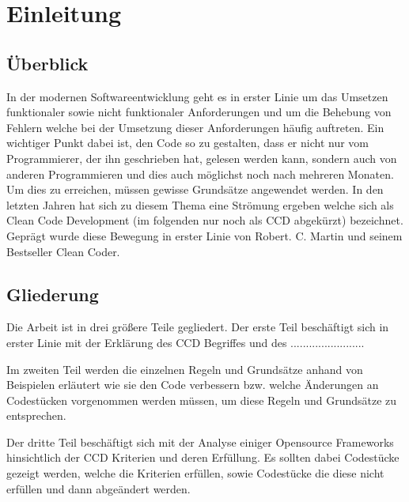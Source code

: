 \chapter{Einleitung}
\label{cha:Einleitung}

\section{Überblick}
In der modernen Softwareentwicklung geht es in erster
Linie um das Umsetzen funktionaler sowie nicht funktionaler
Anforderungen und um die Behebung von Fehlern welche bei der Umsetzung dieser Anforderungen häufig auftreten. Ein wichtiger Punkt dabei ist, den Code so zu gestalten, dass er nicht nur vom Programmierer, der ihn geschrieben hat, gelesen werden kann, sondern auch von anderen Programmieren und dies auch möglichst noch nach mehreren Monaten. Um dies zu erreichen, müssen gewisse Grundsätze angewendet werden. In den letzten Jahren hat sich zu diesem Thema eine Strömung ergeben welche sich als Clean Code Development (im folgenden nur noch als CCD abgekürzt) bezeichnet. Geprägt wurde diese Bewegung in erster Linie von Robert. C. Martin und seinem Bestseller Clean Coder. 

\section{Gliederung}
Die Arbeit ist in drei größere Teile gegliedert. Der erste Teil beschäftigt sich in erster Linie mit der Erklärung des CCD Begriffes und des ........................ 

\SuperPar Im zweiten Teil werden die einzelnen Regeln und Grundsätze anhand von Beispielen erläutert wie sie den Code verbessern bzw. welche Änderungen an Codestücken vorgenommen werden müssen, um diese Regeln und Grundsätze zu entsprechen.

\SuperPar 
Der dritte Teil beschäftigt sich mit der Analyse einiger Opensource Frameworks hinsichtlich der CCD Kriterien und deren Erfüllung. Es sollten dabei Codestücke gezeigt werden, welche die Kriterien erfüllen, sowie Codestücke die diese nicht erfüllen und dann abgeändert werden. 

